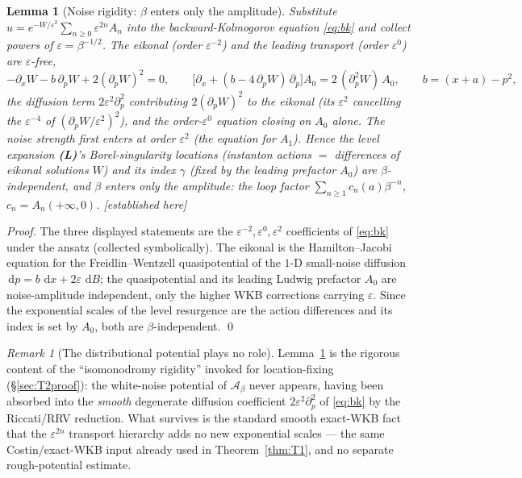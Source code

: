 \documentclass[11pt,reqno]{amsart}
\theoremstyle{plain}
\newtheorem{lemma}[theorem]{Lemma}
\theoremstyle{definition}
\theoremstyle{remark}
\newtheorem{remark}[theorem]{Remark}
\newcommand{\dd}{\,\mathrm{d}}
\newcommand{\SAO}{\mathcal{A}_\beta}
\newcommand{\eps}{\varepsilon}
\newcommand{\tagPr}{{\footnotesize\textsf{[established here]}}}
\begin{document}
\begin{lemma}[Noise rigidity: $\beta$ enters only the amplitude]\label{lem:rigidity}
Substitute $u=e^{-W/\eps^2}\sum_{n\ge0}\eps^{2n}A_n$ into the backward-Kolmogorov equation
\eqref{eq:bk} and collect powers of $\eps=\beta^{-1/2}$. The eikonal (order $\eps^{-2}$) and the
leading transport (order $\eps^{0}$) are \emph{$\eps$-free},
\[
-\partial_x W-b\,\partial_p W+2(\partial_p W)^2=0,\qquad
\bigl[\partial_x+(b-4\,\partial_p W)\,\partial_p\bigr]A_0=2\,(\partial_p^2 W)\,A_0,
\qquad b=(x+a)-p^2,
\]
the diffusion term $2\eps^2\partial_p^2$ contributing $2(\partial_p W)^2$ to the eikonal (its $\eps^2$
cancelling the $\eps^{-4}$ of $(\partial_p W/\eps^2)^2$), and the order-$\eps^0$ equation closing on
$A_0$ alone. The noise strength first enters at order $\eps^2$ (the equation for $A_1$). Hence the
level expansion \textbf{(L)}'s Borel-singularity \emph{locations} (instanton actions $=$ differences
of eikonal solutions $W$) and its \emph{index} $\gamma$ (fixed by the leading prefactor $A_0$) are
$\beta$-independent, and $\beta$ enters only the \emph{amplitude}: the loop factor
$\sum_{n\ge1}c_n(a)\beta^{-n}$, $c_n=A_n(+\infty,0)$. \tagPr
\end{lemma}
\begin{proof}
The three displayed statements are the $\eps^{-2},\eps^{0},\eps^{2}$ coefficients of \eqref{eq:bk}
under the ansatz (collected symbolically). The eikonal is the Hamilton--Jacobi equation for the
Freidlin--Wentzell quasipotential of the $1$-D small-noise diffusion $\dd p=b\,\dd x+2\eps\,\dd B$;
the quasipotential and its leading Ludwig prefactor $A_0$ are noise-amplitude independent, only the
higher WKB corrections carrying $\eps$. Since the exponential scales of the level resurgence are the
action differences and its index is set by $A_0$, both are $\beta$-independent. \qed
\end{proof}

\begin{remark}[The distributional potential plays no role]\label{rem:rough}
Lemma~\ref{lem:rigidity} is the rigorous content of the ``isomonodromy rigidity'' invoked for
location-fixing (\S\ref{sec:T2proof}): the white-noise potential of $\SAO$ never appears, having been
absorbed into the \emph{smooth} degenerate diffusion coefficient $2\eps^2\partial_p^2$ of
\eqref{eq:bk} by the Riccati/RRV reduction. What survives is the standard smooth exact-WKB fact that
the $\eps^{2n}$ transport hierarchy adds no new exponential scales --- the same Costin/exact-WKB input
already used in Theorem~\ref{thm:T1}, and no separate rough-potential estimate.
\end{remark}
\end{document}
